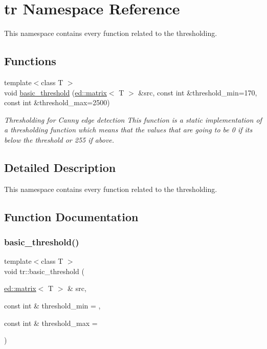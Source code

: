 \hypertarget{namespacetr}{}\section{tr Namespace Reference}
\label{namespacetr}


This namespace contains every function related to the thresholding.  


\subsection*{Functions}
\begin{DoxyCompactItemize}
\item 
{\footnotesize template$<$class T $>$ }\\void \mbox{\hyperlink{namespacetr_a1336850c33551f00835c293b3a534c26}{basic\+\_\+threshold}} (\mbox{\hyperlink{classed_1_1matrix}{ed\+::matrix}}$<$ T $>$ \&src, const int \&threshold\+\_\+min=170, const int \&threshold\+\_\+max=2500)
\begin{DoxyCompactList}\small\item\em Thresholding for Canny edge detection This function is a static implementation of a thresholding function which means that the values that are going to be 0 if its below the threshold or 255 if above. \end{DoxyCompactList}\end{DoxyCompactItemize}


\subsection{Detailed Description}
This namespace contains every function related to the thresholding. 

\subsection{Function Documentation}
\mbox{\label{namespacetr_a1336850c33551f00835c293b3a534c26}} 
\subsubsection{\texorpdfstring{basic\+\_\+threshold()}{basic\_threshold()}}
{\footnotesize\ttfamily template$<$class T $>$ \\
void tr\+::basic\+\_\+threshold (\begin{DoxyParamCaption}\item[{\mbox{\hyperlink{classed_1_1matrix}{ed\+::matrix}}$<$ T $>$ \&}]{src,  }\item[{const int \&}]{threshold\+\_\+min = {},  }\item[{const int \&}]{threshold\+\_\+max = {} }\end{DoxyParamCaption})}



